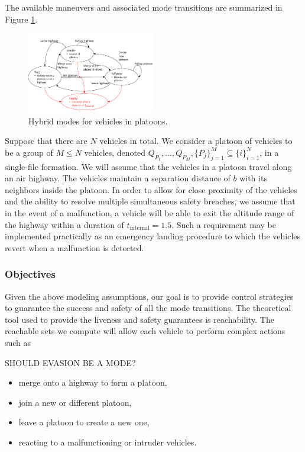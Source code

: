 The available maneuvers and associated mode transitions are summarized in Figure \ref{fig:vehicleModes}.

\begin{figure}
	\centering
	\includegraphics[width=0.5\textwidth]{"fig/vehicleModes"}
	\caption{Hybrid modes for vehicles in platoons.}
	\label{fig:vehicleModes}
\end{figure}

Suppose that there are $N$ vehicles in total. We consider a platoon of vehicles to be a group of $M\le N$ vehicles, denoted $Q_{P_1}, \ldots, Q_{P_M}, \{P_j\}_{j=1}^M \subseteq \{i\}_{i=1}^N$, in a single-file formation. We will assume that the vehicles in a platoon travel along an air highway. The vehicles maintain a separation distance of $b$ with its neighbors inside the platoon. In order to allow for close proximity of the vehicles and the ability to resolve multiple simultaneous safety breaches, we assume that in the event of a malfunction, a vehicle will be able to exit the altitude range of the highway within a duration of $t_\text{internal}=1.5$. Such a requirement may be implemented practically as an emergency landing procedure to which the vehicles revert when a malfunction is detected.

\subsubsection{Objectives}
Given the above modeling assumptions, our goal is to provide control strategies to guarantee the success and safety of all the mode transitions. The theoretical tool used to provide the liveness and safety guarantees is reachability. The reachable sets we compute will allow each vehicle to perform complex actions such as 

SHOULD EVASION BE A MODE?

\begin{itemize}
\item merge onto a highway to form a platoon,
\item join a new or different platoon,
\item leave a platoon to create a new one,
\item reacting to a malfunctioning or intruder vehicles.
\end{itemize}

